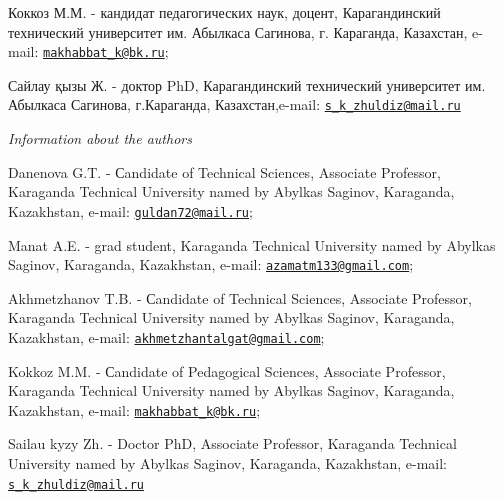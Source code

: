 Коккоз М.М. - кандидат педагогических наук, доцент, Карагандинский
технический университет им. Абылкаса Сагинова, г. Караганда, Казахстан,
e-mail: \href{mailto:makhabbat_k@bk.ru}{\nolinkurl{makhabbat\_k@bk.ru}};

Сайлау қызы Ж. - доктор PhD, Карагандинский технический университет им.
Абылкаса Сагинова, г.Караганда, Казахстан,e-mail:
\href{mailto:s_k_zhuldiz@mail.ru}{\nolinkurl{s\_k\_zhuldiz@mail.ru}}

\emph{Information about the authors}

Danenova G.T. - Сandidate of Technical Sciences, Associate Professor,
Karaganda Technical University named by Abylkas Saginov, Karaganda,
Kazakhstan, e-mail:
\href{mailto:guldan72@mail.ru}{\nolinkurl{guldan72@mail.ru}};

Manat A.E. - grad student, Karaganda Technical University named by
Abylkas Saginov, Karaganda, Kazakhstan, e-mail:
\href{mailto:azamatm133@gmail.com}{\nolinkurl{azamatm133@gmail.com}};

Akhmetzhanov T.B. - Сandidate of Technical Sciences, Associate
Professor, Karaganda Technical University named by Abylkas Saginov,
Karaganda, Kazakhstan, e-mail:
\href{mailto:akhmetzhantalgat@gmail.com}{\nolinkurl{akhmetzhantalgat@gmail.com}};

Kokkoz M.M. - Сandidate of Pedagogical Sciences, Associate Professor,
Karaganda Technical University named by Abylkas Saginov, Karaganda,
Kazakhstan, e-mail:
\href{mailto:makhabbat_k@bk.ru}{\nolinkurl{makhabbat\_k@bk.ru}};

Sailau kyzy Zh. - Doctor PhD, Associate Professor, Karaganda Technical
University named by Abylkas Saginov, Karaganda, Kazakhstan, e-mail:
\href{mailto:s_k_zhuldiz@mail.ru}{\nolinkurl{s\_k\_zhuldiz@mail.ru}}